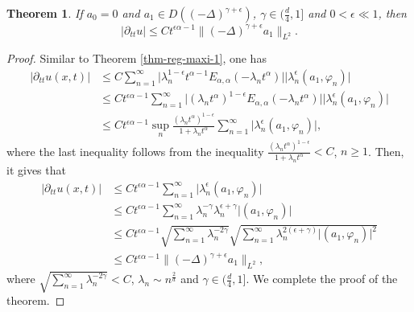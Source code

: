 \documentclass[11pt]{article}
\newtheorem{theorem}{Theorem}
\numberwithin{equation}{section}
\begin{document}
\begin{theorem}\label{thm-reg-maxi-2}
If $a_0=0$ and $a_1\in D((-\Delta)^{\gamma+\epsilon})$, $\gamma\in(\frac{d}{4},1]$ and $0<\epsilon \ll 1$, then
\[
|\partial _{tt}u| \leq Ct^{\epsilon\alpha-1}\|(-\Delta)^{\gamma+\epsilon}a_1\|_{L^2}.
\]
\end{theorem}
\begin{proof}
Similar to Theorem \ref{thm-reg-maxi-1}, one has
\begin{align*}
|\partial_{tt}u(x,t)|
& \le C\sum_{n=1}^{\infty}  \big|\lambda_n^{1-\epsilon}t^{\alpha-1}E_{\alpha,\alpha}(-\lambda_n t^\alpha)\big|\big|\lambda_n^{\epsilon}(a_1, \varphi_n) \big|\\
& \le Ct^{\epsilon\alpha-1}\sum_{n=1}^{\infty}  \big|(\lambda_nt^\alpha)^{1-\epsilon}E_{\alpha,\alpha}(-\lambda_n t^\alpha)\big|\big|\lambda_n^{\epsilon}(a_1, \varphi_n) \big|\\
& \le Ct^{\epsilon\alpha-1}\sup_n\frac{(\lambda_nt^\alpha)^{1-\epsilon}}{1+\lambda_nt^\alpha}\sum_{n=1}^{\infty}\big|\lambda_n^{\epsilon}(a_1, \varphi_n) \big|,
\end{align*}
where the last inequality follows from the inequality $\frac{(\lambda_nt^\alpha)^{1-\epsilon}}{1+\lambda_nt^\alpha}<C$, $n\geq1$.
Then, it gives that
\begin{align*}
|\partial_{tt}u(x,t)|
& \le Ct^{\epsilon\alpha-1}\sum_{n=1}^{\infty}\big|\lambda_n^{\epsilon}(a_1, \varphi_n) \big|\\
& \le Ct^{\epsilon\alpha-1}\sum_{n=1}^{\infty}\lambda_n^{-\gamma}\lambda_n^{\epsilon+\gamma}\big|(a_1, \varphi_n) \big|\\
& \le Ct^{\epsilon\alpha-1}\sqrt{\sum_{n=1}^{\infty}\lambda_n^{-2\gamma}}\sqrt{\sum_{n=1}^{\infty}\lambda_n^{2(\epsilon+\gamma)}\big|(a_1, \varphi_n) \big|^2}\\
& \le Ct^{\epsilon\alpha-1}\|(-\Delta)^{\gamma+\epsilon}a_1\|_{L^2},
\end{align*} 
where $\sqrt{\sum_{n=1}^{\infty}\lambda_n^{-2\gamma}}<C$, $\lambda_n \sim n^\frac{2}{d}$ and $\gamma\in(\frac{d}{4},1]$. We complete the proof of the theorem.
\end{proof}
\end{document}
